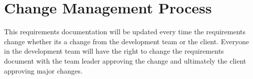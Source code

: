 \documentclass[12pt, a4paper]{article}
\begin{document}
	

	\section{Change Management Process}
	This requirements documentation will be updated every time the requirements change whether its a change from the development team or the client. Everyone in the development team will have the right to change the requirements document with the team leader approving the change and ultimately the client approving major changes.

	\pagebreak

	

	
\end{document}
